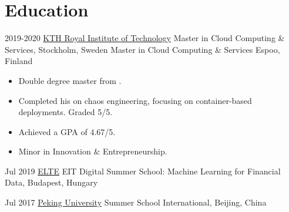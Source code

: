 \section{Education}{
     \customcventry
     {2019-2020}
     {\color{blue}\href{https://kth.se/en}{KTH Royal Institute of Technology}}
     {Master in Cloud Computing \& Services,}
     {Stockholm, Sweden}
     {}{}{} %
     {\color{white}Master in Cloud Computing \& Services}
     {Espoo, Finland}{}{}
     {
     	\begin{itemize}[leftmargin=0.6cm, label={\textbullet}]
     		\item Double degree master from .
     		\item Completed his  on chaos engineering, focusing on container-based deployments. Graded 5/5.
     		\item Achieved a GPA of 4.67/5.
     		\item Minor in Innovation \& Entrepreneurship.
     	\end{itemize}
     }
     
     \customcventry
     {Jul 2019}
     {\color{blue}\href{https://www.elte.hu/en/}{ELTE}}
     {EIT Digital Summer School: Machine Learning for Financial Data,}
     {Budapest, Hungary}
     {}{}
     {
    \vspace{2mm} %
     }
    
      \customcventry
     {Jul 2017}
     {\color{blue}\href{http://www.oir.pku.edu.cn/summerschool/}{Peking University}}
     {Summer School International,}
     {Beijing, China}
     {}{}
     {
         \vspace{2mm} %
     }
     
}
